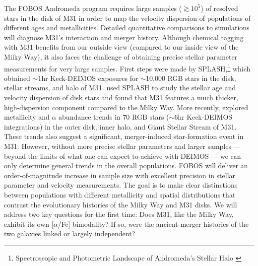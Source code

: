 \documentclass[11pt,a4paper,twoside,onecolumn,openany,final,oldfontcommands]{memoir}
\begin{document}
The FOBOS Andromeda program requires large samples ($\gtrsim 10^5$) of resolved stars in the disk of M31 in order to map the velocity dispersion of populations of different ages and metallicities.  Detailed quantitative comparisons to simulations will diagnose M31's interaction and merger history.  Although chemical tagging with M31 benefits from our outside view (compared to our inside view of the Milky Way), it also faces the challenge of obtaining precise stellar parameter measurements for very large samples.  First steps were made by SPLASH,\footnote{Spectroscopic and Photometric Landscape of Andromeda’s Stellar Halo \citep[e.g.][]{splash}} which obtained $\sim$1hr Keck-DEIMOS exposures for $\sim$10,000 RGB stars in the disk, stellar streams, and halo of M31.  \citet{dorman15} used SPLASH to study the stellar age and velocity dispersion of disk stars and found that M31 features a much thicker, high-dispersion component compared to the Milky Way.  More recently, \citet{escala20} explored metallicity and $\alpha$ abundance trends in 70 RGB stars ($\sim$6hr Keck-DEIMOS integrations) in the outer disk, inner halo, and Giant Stellar Stream of M31.  These trends also suggest a significant, merger-induced star-formation event in M31.  However, without more precise stellar parameters and larger samples --- beyond the limits of what one can expect to achieve with DEIMOS --- we can only determine general trends in the overall populations.  FOBOS will deliver an order-of-magnitude increase in sample size with excellent precision in stellar parameter and velocity measurements.  The goal is to make clear distinctions between populations with different metallicity and spatial distributions that contrast the evolutionary histories of the Milky Way and M31 disks.  We will address two key questions for the first time: Does M31, like the Milky Way, exhibit its own [$\alpha$/Fe] bimodality?  If so, were the ancient merger histories of the two galaxies linked or largely independent? 
\end{document}
